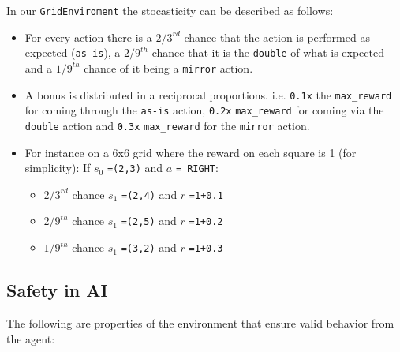 \documentclass{article} %
\begin{document}
In our \verb|GridEnviroment| the stocasticity can be described as follows:
\begin{itemize}
    \item For every action there is a $2/3^{rd}$ chance that the action is performed as
        expected (\verb|as-is|), a $2/9^{th}$ chance that it is the \verb|double| of what 
        is expected and a $1/9^{th}$ chance of it being a \verb|mirror| action.
    \item A bonus is distributed in a reciprocal proportions. i.e. \verb|0.1x| the
        \verb|max_reward| for coming through the \verb|as-is| action, \verb|0.2x| \verb|max_reward|
        for coming via the \verb|double| action and \verb|0.3x| \verb|max_reward| for the
        \verb|mirror| action.
    \item For instance on a 6x6 grid where the reward on each square is 1 (for simplicity):
    \newline
    If $s_0$ \verb|=(2,3)| and $a$ \verb|= RIGHT|:
        \begin{itemize}
            \item $2/3^{rd}$ chance $s_1$ \verb|=(2,4)| and $r$ \verb|=1+0.1|
            \item $2/9^{th}$ chance $s_1$ \verb|=(2,5)| and $r$ \verb|=1+0.2|
            \item $1/9^{th}$ chance $s_1$ \verb|=(3,2)| and $r$ \verb|=1+0.3|
        \end{itemize}
\end{itemize}

\subsection{Safety in AI}
\label{sec:safety}
The following are properties of the environment that ensure valid behavior from the agent:
\end{document}
